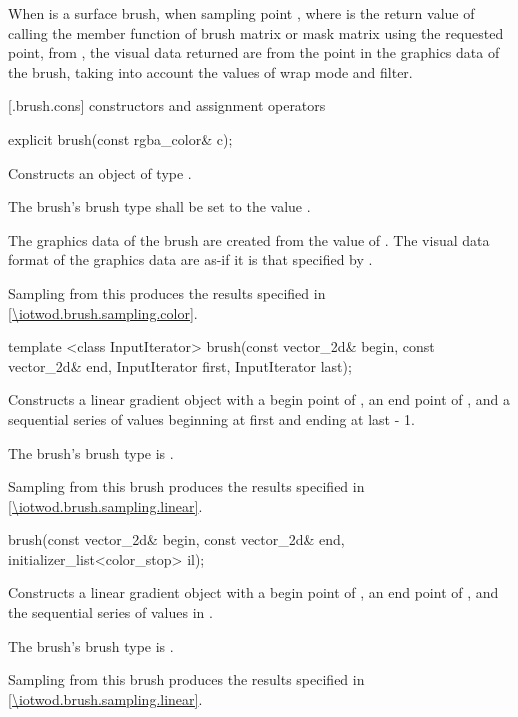 \pnum
When  is a surface brush, when sampling point , where  is the return value of calling the  member function of brush matrix or mask matrix using the requested point, from , the visual data returned are from the point  in the graphics data of the brush, taking into account the values of wrap mode and filter.

 [\iotwod.brush.cons] { constructors and assignment operators}

%
\begin{itemdecl}
explicit brush(const rgba_color& c);
\end{itemdecl}
\begin{itemdescr}
\pnum
\effects
Constructs an object of type .

\pnum
The brush's brush type shall be set to the value .

\pnum
The graphics data of the brush are created from the value of . The visual data format of the graphics data are as-if it is that specified by .

\pnum
\remarks
Sampling from this produces the results specified in \ref{\iotwod.brush.sampling.color}.
\end{itemdescr}

%
\begin{itemdecl}
template <class InputIterator>
brush(const vector_2d& begin, const vector_2d& end,
  InputIterator first, InputIterator last);
\end{itemdecl}
\begin{itemdescr}
\pnum
\effects
Constructs a linear gradient  object with a begin point of , an end point of , and a sequential series of  values beginning at {first} and ending at {last - 1}.

\pnum
The brush's brush type is .

\pnum
\remarks
Sampling from this brush produces the results specified in \ref{\iotwod.brush.sampling.linear}.
\end{itemdescr}

%
\begin{itemdecl}
brush(const vector_2d& begin, const vector_2d& end,
  initializer_list<color_stop> il);
\end{itemdecl}
\begin{itemdescr}
\pnum
\effects
Constructs a linear gradient  object with a begin point of , an end point of , and the sequential series of  values in .

\pnum
The brush's brush type is .

\pnum
\remarks
Sampling from this brush produces the results specified in \ref{\iotwod.brush.sampling.linear}.
\end{itemdescr}

